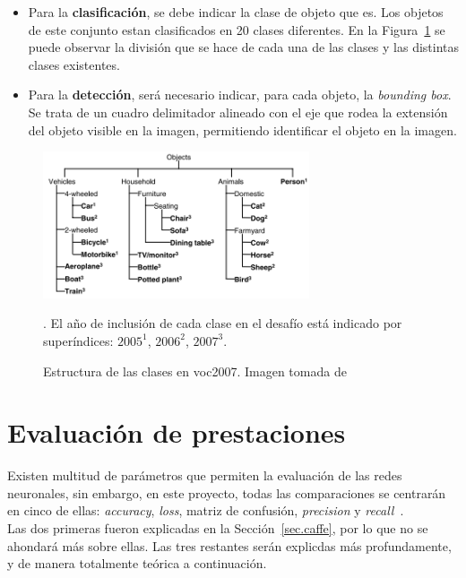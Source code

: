 \begin{itemize}
	\item Para la \textbf{clasificación}, se debe indicar la clase de objeto que es. Los objetos de este conjunto estan clasificados en 20 clases diferentes. En la Figura~\ref{fig.clasesVOC} se puede observar la división que se hace de cada una de las clases y las distintas clases existentes.
	\item Para la \textbf{detección}, será necesario indicar, para cada objeto, la \textit{bounding box}. Se trata de un cuadro delimitador alineado con el eje que rodea la extensión del objeto visible en la imagen, permitiendo identificar el objeto en la imagen.
\end{itemize}
\begin{figure}[H]
	\begin{center}
		\includegraphics[width=0.7\textwidth]{figures/vocclasses}
		\caption{Estructura de las clases en \acrfull{voc}2007. Imagen tomada de~\cite{Everingham10}}. El año de inclusión de cada clase en el desafío está indicado por
		superíndices: $2005^1$, $2006^2$, $2007^3$.
		\label{fig.clasesVOC}
	\end{center}
\end{figure}

\section{Evaluación de prestaciones} \label{sec.prestaciones}
Existen multitud de parámetros que permiten la evaluación de las redes neuronales, sin embargo, en este proyecto, todas las comparaciones se centrarán en cinco de ellas: \textit{accuracy}, \textit{loss}, matriz de confusión, \textit{precision} y \textit{recall}~\cite{pullum2007guidance}.\\

Las dos primeras fueron explicadas en la Sección~\ref{sec.caffe}, por lo que no se ahondará más sobre ellas. Las tres restantes serán explicdas más profundamente, y de manera totalmente teórica a continuación.

